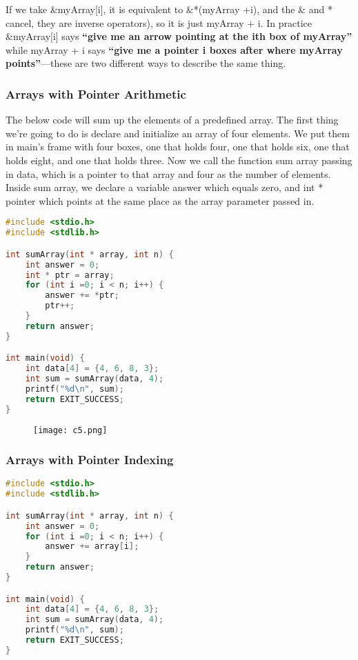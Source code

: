 \documentclass[12pt,a4paper]{article}
\begin{document}
If we take \&myArray[i], it is equivalent to \&*(myArray +i), and the \& and * 
cancel, they are inverse operators), so it is just myArray + i. In practice
\&myArray[i] says \textbf{“give me an arrow pointing at the ith box of myArray”}
while myArray + i says \textbf{“give me a pointer i boxes after where myArray 
points”}—these are two different ways to describe the same thing.

\subsubsection{Arrays with Pointer Arithmetic}

The below code will sum up the elements of a predefined array. The first thing 
we're going to do is declare and initialize an array of four elements. We put 
them in main's frame with four boxes, one that holds four, one that holds six, 
one that holds eight, and one that holds three. Now we call the function sum
array passing in data, which is a pointer to that array and four as the number
of elements. Inside sum array, we declare a variable answer which equals zero,
and int * pointer which points at the same place as the array parameter passed
in.

\begin{lstlisting}[language=C]
#include <stdio.h>
#include <stdlib.h>

int sumArray(int * array, int n) {
	int answer = 0;
	int * ptr = array;
	for (int i =0; i < n; i++) {
		answer += *ptr;
		ptr++;
	}
	return answer;
}

int main(void) {
	int data[4] = {4, 6, 8, 3};
	int sum = sumArray(data, 4);
	printf("%d\n", sum);
	return EXIT_SUCCESS;
}
\end{lstlisting}

\begin{figure}[!htbp]
\centering
\texttt{[image: c5.png]}
\end{figure}


\subsubsection{Arrays with Pointer Indexing}

\begin{lstlisting}[language=C]
#include <stdio.h>
#include <stdlib.h>

int sumArray(int * array, int n) {
	int answer = 0;
	for (int i =0; i < n; i++) {
		answer += array[i];
	}
	return answer;
}

int main(void) {
	int data[4] = {4, 6, 8, 3};
	int sum = sumArray(data, 4);
	printf("%d\n", sum);
	return EXIT_SUCCESS;
}
\end{lstlisting}
\end{document}
